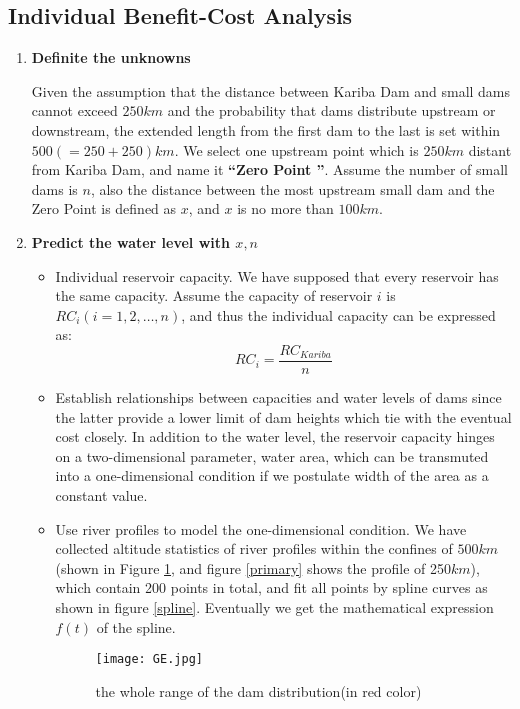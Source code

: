 \documentclass[12pt]{article}%
\newcommand{\upcite}[1]{\textsuperscript{\textsuperscript{\cite{#1}}}}%
\begin{document}
\subsection{Individual Benefit-Cost Analysis}
\begin{enumerate}[1.]
	\item{\textbf{Definite the unknowns}} 
\par\noindent
Given the assumption that the distance between Kariba Dam and small dams cannot exceed $250km$ and the probability that dams distribute upstream or downstream, the extended length from the first dam to the last is set within $500(=250+250)km$. We select one upstream point which is $250km$ distant from Kariba Dam, and name it \textbf{“Zero Point ”}. Assume the number of small dams is $n$, also the distance between the most upstream small dam and the Zero Point is defined as $x$, and $x$ is no more than $100km$.
	\item{\textbf{Predict the water level with $x,n$}}
		\begin{itemize}
    	\item Individual reservoir capacity. We have supposed that every reservoir has the same capacity. Assume the capacity of reservoir $i$ is $RC_{i}(i=1,2,\dots,n)$, and thus the individual capacity can be expressed as:
$$RC_{i} = \frac{RC_{Kariba}}{n}$$
    	\item Establish relationships between capacities and water levels of dams since the latter provide a lower limit of dam heights which tie with the eventual cost closely. In addition to the water level, the reservoir capacity hinges on a two-dimensional parameter, water area, which can be transmuted into a one-dimensional condition if we postulate width of the area   as a constant value.
    	\item Use river profiles to model the one-dimensional condition. We have collected altitude statistics of river profiles within the confines of $500km$ (shown in Figure \ref{Google Earth}, and figure \ref{primary} shows the profile of 250$km$), which contain 200 points in total, and fit all points by spline curves as shown in figure \ref{spline}. Eventually we get the mathematical expression $f(t)$ of the spline.\upcite{ge}
	\begin{figure}[H]
	\centering
	\texttt{[image: GE.jpg]}
	\caption{the whole range of the dam distribution(in red color)}
	\label{Google Earth}
	\end{figure}

\end{itemize}
\end{enumerate}
\end{document}
